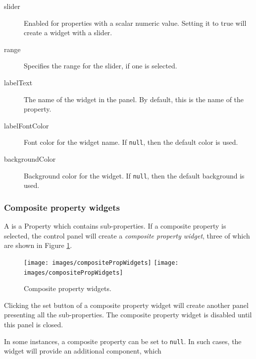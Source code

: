 \documentclass{article}
\begin{document}
\begin{description}

\item[slider]\mbox{}

Enabled for properties with a scalar numeric value.
Setting it to true will create a widget with a slider.

\item[range]\mbox{}

Specifies the range for the slider, if one is selected.

\item[labelText]\mbox{}

The name of the widget in the panel. By default, this is the
name of the property.

\item[labelFontColor]\mbox{}

Font color for the widget name. If {\tt null}, then the default color 
is used.

\item[backgroundColor]\mbox{}

Background color for the widget. If {\tt null}, then the default 
background is used.

\end{description}

\subsubsection{Composite property widgets}

A  is a Property which contains
sub-properties. If a composite property is selected, the control panel
will create a {\it composite property widget}, three of which are shown in
Figure \ref{compositePropWidgetsFig}.

\begin{figure}
\begin{center}
\iflatexml
\texttt{[image: images/compositePropWidgets]}
\else
\texttt{[image: images/compositePropWidgets]}
\fi
\end{center}
\caption{Composite property widgets.}%
\label{compositePropWidgetsFig}
\end{figure}

Clicking the {\sf set} button of a composite property widget will create
another panel presenting all the sub-properties. The composite
property widget is disabled until this panel is closed.

In some instances, a composite property can be set to {\tt null}.  In such
cases, the widget will provide an additional component, which
\end{document}
